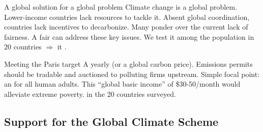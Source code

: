 \documentclass[aspectratio=169,xcolor=dvipsnames, 11pt,mathserif]{beamer}
\begin{document}
\begin{frame}{A global solution for a global problem}
    \bbsp \ip Climate change is a global problem.
    \ip Lower-income countries lack resources to tackle it.
    \ip Absent global coordination, countries lack incentives to decarbonize.
    \ip Many ponder over the current lack of fairness.
    \ip A fair  can address these key issues.
    \ip We test it among the population in 20 countries \pause $\Rightarrow$ it .
    \ee
\end{frame}




\begin{frame}{Meeting the Paris target}
\bbsp \ip {}
\ip \quad A yearly  \pause (or a global carbon price).
\ip Emissions permits should be tradable and auctioned to polluting firms upstream.
\ip {}
\ip \quad Simple focal point: an  for all human adults.
\ip \quad This ``global basic income'' of \$30-50/month would alleviate extreme poverty. 
\ip {}   in the 20 countries surveyed.
\ee    
\end{frame}


\subsection{Support for the Global Climate Scheme}
\end{document}
